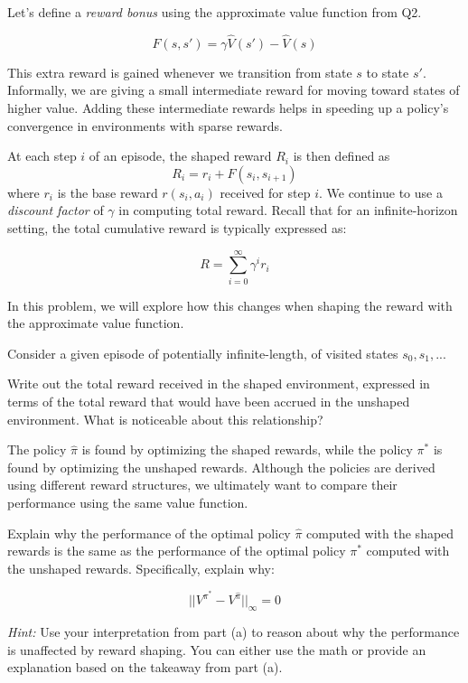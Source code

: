 \documentclass[11pt]{article}
\begin{document}
\noindent Let's define a \emph{reward bonus} using the approximate value function from Q2. 

$$F(s,s') = \gamma \hat V(s') - \hat V(s)$$

\noindent This extra reward is gained whenever we transition from state $s$ to state $s'$. 
Informally, we are giving a small intermediate reward for moving toward states of higher value. Adding these intermediate rewards helps in speeding up a policy's convergence in environments with sparse rewards.

\noindent At each step $i$ of an episode, the shaped reward $R_i$ is then defined as
$$R_i = r_i + F(s_i,s_{i+1})$$
where $r_i$ is the base reward $r(s_i, a_i)$ received for step $i$. We continue to use a \emph{discount factor} of $\gamma$ in computing total reward. Recall that for an infinite-horizon setting, the total cumulative reward is typically expressed as:

$$R = \sum_{i = 0}^{\infty} \gamma^i r_i$$

\noindent In this problem, we will explore how this changes when shaping the reward with the approximate value function.
\newline


 \noindent Consider a given episode of potentially infinite-length, of visited states $s_0, s_1,...$ 

\noindent Write out the total reward received in the shaped environment, expressed in terms of the total reward that would have been accrued in the unshaped environment. What is noticeable about this relationship? 
\newline

 The policy $\hat \pi$ is found by optimizing the shaped rewards, while the policy $\pi^*$ is found by optimizing the unshaped rewards. Although the policies are derived using different reward structures, we ultimately want to compare their performance using the same value function.
\newline

\noindent Explain why the performance of the optimal policy $\hat \pi$ computed with the shaped rewards is the same as the performance of the optimal policy $\pi^*$ computed with the unshaped rewards. Specifically, explain why:

$$||V^{\pi^*} - V^{\hat \pi}||_{\infty} = 0$$

\noindent \textit{Hint:} Use your interpretation from part (a) to reason about why the performance is unaffected by reward shaping. You can either use the math or provide an explanation based on the takeaway from part (a).
\end{document}
